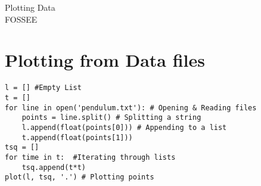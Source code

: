 \documentclass[12pt]{article}
\begin{document}
\date{}
\vspace{-1in}
\begin{center}
\LARGE{Plotting Data}\\
\large{FOSSEE}
\end{center}
\section{Plotting from Data files}
\begin{verbatim}
l = [] #Empty List
t = []
for line in open('pendulum.txt'): # Opening & Reading files
    points = line.split() # Splitting a string
    l.append(float(points[0])) # Appending to a list
    t.append(float(points[1]))
tsq = []
for time in t:  #Iterating through lists
    tsq.append(t*t)
plot(l, tsq, '.') # Plotting points
\end{verbatim}
\end{document}
